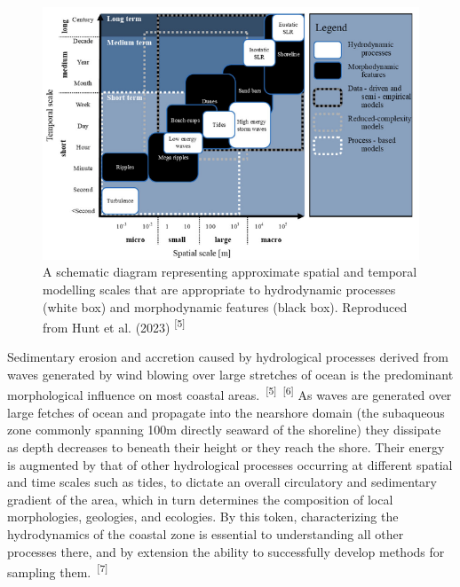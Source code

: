 \documentclass{article}
\begin{document}

\begin{figure}
    \centering
    \includegraphics[width=0.8\linewidth]{images/spatial-and-temporal.png}
    \caption{A schematic diagram representing approximate spatial and temporal modelling scales that are appropriate to hydrodynamic processes (white box) and morphodynamic features (black box). Reproduced from Hunt et al. (2023) \textsuperscript{[5]}}
    \label{figure1}
\end{figure}


\par{Sedimentary erosion and accretion caused by hydrological processes derived from waves generated by wind blowing over large stretches of ocean is the predominant morphological influence on most coastal areas.~\textsuperscript{[5]}~\textsuperscript{[6]} As waves are generated over large fetches of ocean and propagate into the nearshore domain (the subaqueous zone commonly spanning 100m directly seaward of the shoreline) they dissipate as depth decreases to beneath their height or they reach the shore. Their energy is augmented by that of other hydrological processes occurring at different spatial and time scales such as tides, to dictate an overall circulatory and sedimentary gradient of the area, which in turn determines the composition of local morphologies, geologies, and ecologies. By this token, characterizing the hydrodynamics of the coastal zone is essential to understanding all other processes there, and by extension the ability to successfully develop methods for sampling them.~\textsuperscript{[7]}}

\end{document}

